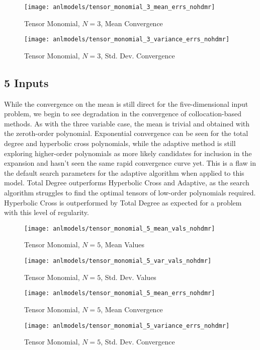 \begin{figure}[H]
  \centering
  \texttt{[image: anlmodels/tensor\_monomial\_3\_mean\_errs\_nohdmr]}
  \caption{Tensor Monomial, $N=3$, Mean Convergence}
  \label{fig:tensormono mean errors 3}
\end{figure}
\begin{figure}[H]
  \centering
  \texttt{[image: anlmodels/tensor\_monomial\_3\_variance\_errs\_nohdmr]}
  \caption{Tensor Monomial, $N=3$, Std. Dev. Convergence}
  \label{fig:tensormono var errors 3}
\end{figure}

\subsection{5 Inputs}
While the convergence on the mean is still direct for the five-dimensional input problem, we begin to see
degradation in the convergence of collocation-based methods.  
As with the three variable case, the mean is trivial and obtained with the zeroth-order polynomial.  
Exponential
convergence can be seen for the total degree and hyperbolic cross polynomials, while the adaptive
method
is still exploring higher-order polynomials as more likely candidates for inclusion in the expansion and hasn't
seen the same rapid convergence curve yet.  This is a flaw in the default search parameters for the adaptive
algorithm when applied to this model.
Total Degree outperforms Hyperbolic Cross and Adaptive, as
the search algorithm struggles to find the optimal tensors of low-order polynomials required.  Hyperbolic
Cross is outperformed by Total Degree as expected for a problem with this level of regularity.
\begin{figure}[H]
  \centering
  \texttt{[image: anlmodels/tensor\_monomial\_5\_mean\_vals\_nohdmr]}
  \caption{Tensor Monomial, $N=5$, Mean Values}
  \label{fig:tensormono mean values 5}
\end{figure}
\begin{figure}[H]
  \centering
  \texttt{[image: anlmodels/tensor\_monomial\_5\_var\_vals\_nohdmr]}
  \caption{Tensor Monomial, $N=5$, Std. Dev. Values}
  \label{fig:tensormono var values 5}
\end{figure}

\begin{figure}[H]
  \centering
  \texttt{[image: anlmodels/tensor\_monomial\_5\_mean\_errs\_nohdmr]}
  \caption{Tensor Monomial, $N=5$, Mean Convergence}
  \label{fig:tensormono mean errors 5}
\end{figure}
\begin{figure}[H]
  \centering
  \texttt{[image: anlmodels/tensor\_monomial\_5\_variance\_errs\_nohdmr]}
  \caption{Tensor Monomial, $N=5$, Std. Dev. Convergence}
  \label{fig:tensormono var errors 5}
\end{figure}


